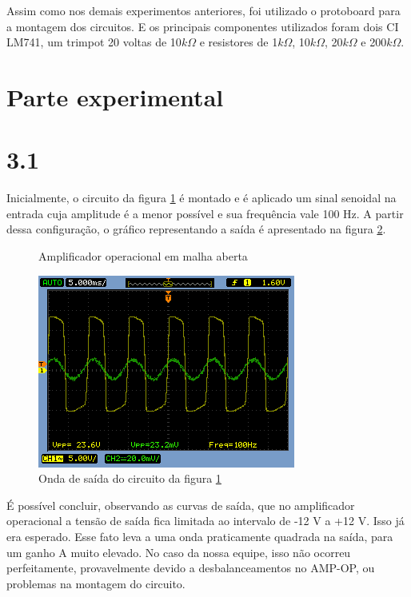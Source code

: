 \documentclass[brazil]{article}
\begin{document}
Assim como nos demais experimentos anteriores, foi utilizado o protoboard para a montagem dos circuitos. E os principais componentes utilizados foram dois CI LM741, um trimpot 20 voltas de 10$k\Omega$ e resistores  de 1$k\Omega$, 10$k\Omega$, 20$k\Omega$ e 200$k\Omega$. 



\section*{Parte experimental}

\section*{3.1}
Inicialmente, o circuito da figura \ref{circ:4} é montado e é aplicado um sinal senoidal na entrada cuja amplitude é a menor possível e sua frequência vale 100 Hz. A partir dessa configuração, o gráfico representando a saída é apresentado na figura \ref{3.1}.

\vspace{3mm}
\begin{figure}[h]
\centerline{}
\caption{Amplificador operacional em malha aberta \label{circ:4}}
\end{figure}


\begin{figure}[H]
\begin{centering}
\includegraphics[scale=0.5]{figuras/31bck}
\caption{Onda de saída do circuito da figura \ref{circ:4} \label{3.1}}
\par\end{centering}
\end{figure}


 É possível concluir, observando as curvas de saída, que no amplificador operacional a tensão de saída fica limitada ao intervalo de -12 V a +12 V. Isso já era esperado. Esse fato leva a uma onda praticamente quadrada na saída, para um ganho A muito elevado. No caso da nossa equipe, isso não ocorreu perfeitamente, provavelmente devido a desbalanceamentos no AMP-OP, ou problemas na montagem do circuito.
\end{document}
